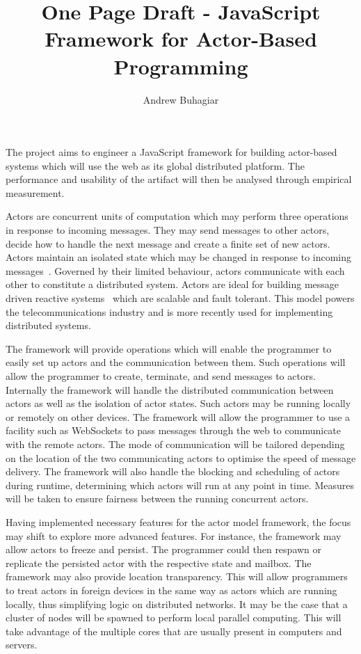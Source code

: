 \documentclass[12pt]{report}
\author{Andrew Buhagiar}
\title{One Page Draft - JavaScript Framework for Actor-Based Programming}
\begin{document}
\maketitle
The project aims to engineer a JavaScript framework for building actor-based systems which will use the web as its global distributed platform. The performance and usability of the artifact will then be analysed through empirical measurement.

Actors are concurrent units of computation which may perform three operations in response to incoming messages. They may send messages to other actors, decide how to handle the next message and create a finite set of new actors. Actors maintain an isolated state which may be changed in response to incoming messages~\cite{agha_1985}. Governed by their limited behaviour, actors communicate with each other to constitute a distributed system. Actors are ideal for building message driven reactive systems~\cite{reactivemanifesto} which are scalable and fault tolerant. This model powers the telecommunications industry and is more recently used for implementing distributed systems.

The framework will provide operations which will enable the programmer to easily set up actors and the communication between them. Such operations will allow the programmer to create, terminate, and send messages to actors. Internally the framework will handle the distributed communication between actors as well as the isolation of actor states. Such actors may be running locally or remotely on other devices. The framework will allow the programmer to use a facility such as WebSockets to pass messages through the web to communicate with the remote actors. The mode of communication will be tailored depending on the location of the two communicating actors to optimise the speed of message delivery. The framework will also handle the blocking and scheduling of actors during runtime, determining which actors will run at any point in time. Measures will be taken to ensure fairness between the running concurrent actors.

Having implemented necessary features for the actor model framework, the focus may shift to explore more advanced features. For instance, the framework may allow actors to freeze and persist. The programmer could then respawn or replicate the persisted actor with the respective state and mailbox. The framework may also provide location transparency. This will allow programmers to treat actors in foreign devices in the same way as actors which are running locally, thus simplifying logic on distributed networks. It may be the case that a cluster of nodes will be spawned to perform local parallel computing. This will take advantage of the multiple cores that are usually present in computers and servers.
\end{document}
